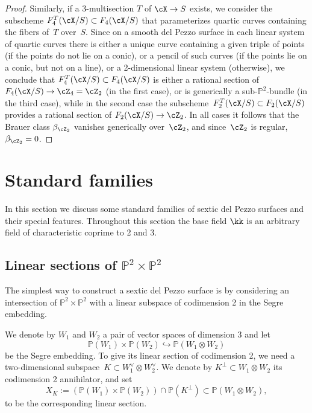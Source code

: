 \documentclass[11pt]{amsart}
\renewcommand{\P}{{\mathbb{P}}}
\theoremstyle{plain}
\theoremstyle{definition}
\theoremstyle{remark}
\begin{document}
\begin{proof}
Similarly, if a 3-multisection $T$ of $\cX \to S$ exists, we consider the subscheme $F_4^T(\cX/S) \subset F_4(\cX/S)$
that parameterizes quartic curves containing the fibers of~$T$ over~$S$.
Since on a smooth del Pezzo surface in each linear system of quartic curves there is either a unique curve 
containing a given triple of points (if the points do not lie on a conic), 
or a pencil of such curves (if the points lie on a conic, but not on a line),
or a 2-dimensional linear system (otherwise),
we conclude that $F_4^T(\cX/S) \subset F_4(\cX/S)$ is 
either a rational section of $F_4(\cX/S) \to \cZ_4 = \cZ_2$ (in the first case),
or is generically a sub-$\P^2$-bundle (in the third case), 
while in the second case the subscheme~$F_2^T(\cX/S) \subset F_2(\cX/S)$ provides a rational section of $F_2(\cX/S) \to \cZ_2$.
In all cases it follows that the Brauer class $\beta_{\cZ_2}$ vanishes generically over~$\cZ_2$, 
and since~$\cZ_2$ is regular, $\beta_{\cZ_2} = 0$.
\end{proof}




\section{Standard families}\label{section:special-families}


In this section we discuss some standard families of sextic del Pezzo surfaces and their special features.
Throughout this section the base field $\kk$ is an arbitrary field of characteristic coprime to 2 and 3.

\subsection{Linear sections of $\P^2 \times \P^2$}\label{subsection:p2p2}

The simplest way to construct a sextic del Pezzo surface is by considering an intersection of $\P^2 \times \P^2$ 
with a linear subspace of codimension 2 in the Segre embedding.

We denote by $W_1$ and $W_2$ a pair of vector spaces of dimension 3 and let 
\begin{equation*}
\P(W_1) \times \P(W_2) \hookrightarrow \P(W_1 \otimes W_2)
\end{equation*}
be the Segre embedding. 
To give its linear section of codimension 2, we need a two-dimensional subspace~$K \subset W_1^\vee \otimes W_2^\vee$.
We denote by $K^\perp \subset W_1 \otimes W_2$ its codimension 2 annihilator, and set
\begin{equation}\label{eq:xk}
X_K := (\P(W_1) \times \P(W_2)) \cap \P(K^\perp) \subset \P(W_1 \otimes W_2), 
\end{equation}
to be the corresponding linear section.
\end{document}

